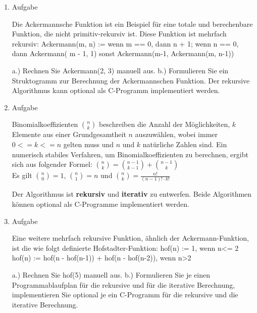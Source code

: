 \documentclass[12pt,a4paper]{scrreprt}
\begin{document}
\begin{enumerate}
\begin{comment}
\begin{lstlisting}
unsigned long long fibi(unsigned char n){
	unsigned long long *f;
	unsigned long long i,r;
	if(n<=14)return (unsigned long long)n;
	f=(unsigned long long*)malloc((n+1)*sizeof(unsigned lon long));
	f[0]=0ULL;//zwei elm reichen statt 
	f[1]=1ULL;
	for(i=2U ; i<=n ; i++){
		f[i]=f[i-1]+f[i-1];
	}
	r=f[n];
	free(f);
	return f[i-1];
}
\end{lstlisting}

\end{comment}

\item Aufgabe %

Die Ackermannsche Funktion ist ein Beispiel für eine totale und berechenbare
Funktion, die nicht primitiv-rekursiv ist. Diese Funktion ist mehrfach rekursiv:
Ackermann(m, n) := wenn m == 0, dann n + 1;
wenn n == 0, dann Ackermann( m - 1, 1)
sonst Ackermann(m-1, Ackermann(m, n-1))

a.) Rechnen Sie Ackermann(2, 3) manuell aus.
b.) Formulieren Sie ein Struktogramm zur Berechnung der Ackermannschen Funktion.
Der rekursive Algorithmus kann optional als C-Programm implementiert werden.

\item Aufgabe %

Binomialkoeffizienten $\binom{n}{k}$ beschreiben die Anzahl der Möglichkeiten, $k$ Elemente aus einer Grundgesamtheit $n$ auszuwählen, wobei immer $0 <= k <= n$ gelten muss und $n$ und $k$ natürliche Zahlen sind. Ein numerisch stabiles Verfahren, um Binomialkoeffizienten zu berechnen, ergibt sich aus folgender Formel:
$\binom{n}{k} = \binom{n-1}{k-1}+\binom{n-1}{k}$ \\
Es gilt $\binom{n}{0}=1$, $\binom{n}{1}=n$ und $\binom{n}{k}=\frac{n!}{(n-1)! \cdot k!}$

Der Algorithmus ist \textbf{rekursiv} und \textbf{iterativ} zu entwerfen. Beide Algorithmen können optional als C-Programme implementiert werden.

\begin{comment}
n ueber k mit einer matrix

iterativ
\begin{tabular}
0 & k	\\
n & 1 & 0 & 0 & 0	\\
  & ... & 1 & 1 & 0	\\
  & 1 & 2
\end{tabular}

\end{comment}

\item Aufgabe %

Eine weitere mehrfach rekursive Funktion, ähnlich der Ackermann-Funktion, ist die wie folgt definierte Hofstadter-Funktion:
hof(n) := 1, wenn n<= 2
hof(n) := hof(n - hof(n-1)) + hof(n - hof(n-2)), wenn n>2

a.) Rechnen Sie hof(5) manuell aus.
b.) Formulieren Sie je einen Programmablaufplan für die rekursive und für die iterative Berechnung, implementieren Sie optional je ein C-Programm für die rekursive und die iterative Berechnung.

\end{enumerate}
\end{document}
